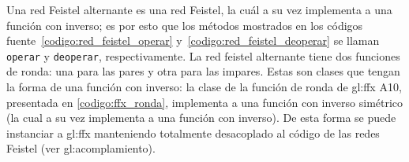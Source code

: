Una red Feistel alternante es una red Feistel, la cuál a su vez implementa a
una función con inverso; es por esto que los métodos mostrados en los códigos
fuente~\ref{codigo:red_feistel_operar} y~\ref{codigo:red_feistel_deoperar} se
llaman \texttt{operar} y \texttt{deoperar}, respectivamente. La red feistel
alternante tiene dos funciones de  ronda: una para las pares y otra para las
impares. Estas son clases que  tengan la forma de una función con inverso: la
clase de la función de ronda de \gls{gl:ffx} A10, presentada en
\ref{codigo:ffx_ronda}, implementa a una función con inverso simétrico (la cual
a su vez implementa a una función con inverso). De esta forma se puede
instanciar a \gls{gl:ffx} manteniendo totalmente desacoplado al código de las
redes Feistel (ver \gls{gl:acomplamiento}).

